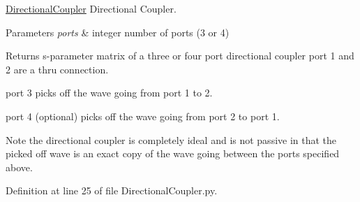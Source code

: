 \hyperlink{namespaceSignalIntegrity_1_1Devices_1_1DirectionalCoupler}{Directional\+Coupler} Directional Coupler. 


\begin{DoxyParams}{Parameters}
{\em ports} & integer number of ports (3 or 4) \\
\hline
\end{DoxyParams}
\begin{DoxyReturn}{Returns}
s-\/parameter matrix of a three or four port directional coupler port 1 and 2 are a thru connection.
\end{DoxyReturn}
port 3 picks off the wave going from port 1 to 2.

port 4 (optional) picks off the wave going from port 2 to port 1.

\begin{DoxyNote}{Note}
the directional coupler is completely ideal and is not passive in that the picked off wave is an exact copy of the wave going between the ports specified above. 
\end{DoxyNote}


Definition at line 25 of file Directional\+Coupler.\+py.

